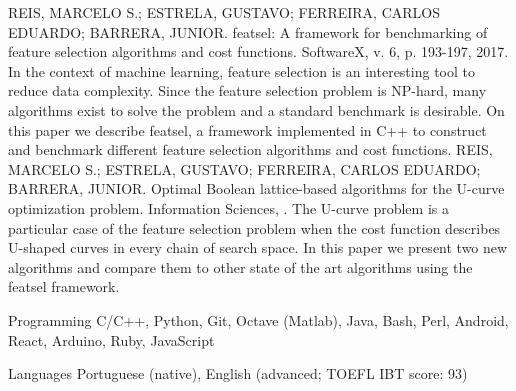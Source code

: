 \documentclass[11pt, a4paper]{awesome-cv-res}
\begin{document}
\begin{cventries}
\cventry
    {REIS, MARCELO S.; ESTRELA, GUSTAVO; FERREIRA, CARLOS EDUARDO; BARRERA, JUNIOR.}
    {featsel: A framework for benchmarking of feature selection algorithms and cost functions.}
    {SoftwareX, v. 6, p. 193-197, 2017.}
    {}
    {In the context of machine learning, feature selection is an 
    interesting tool to reduce data complexity. Since the feature 
    selection problem is NP-hard, many algorithms exist to solve the 
    problem and a standard benchmark is desirable. On this paper we 
    describe featsel, a framework implemented in C++ to construct and 
    benchmark different feature selection algorithms and cost 
    functions.}
\cventry
    {REIS, MARCELO S.; ESTRELA, GUSTAVO; FERREIRA, CARLOS EDUARDO; BARRERA, JUNIOR.}
    {Optimal Boolean lattice-based algorithms for the U-curve optimization problem.}
    {Information Sciences, .}
    {}
    {The U-curve problem is a particular case of the feature selection
    problem when the cost function describes U-shaped curves in every
    chain of search space. In this paper we present two new algorithms
    and compare them to other state of the art algorithms using the 
    featsel framework.}
\end{cventries}

\begin{cvskills}
\cvskill
{Programming} %
{C/C++, Python, Git, Octave (Matlab), Java, Bash, Perl,
Android, React, Arduino, Ruby, JavaScript}

\cvskill
{Languages} %
{Portuguese (native), English (advanced; TOEFL IBT score: 93)} %
\end{cvskills}
\end{document}
